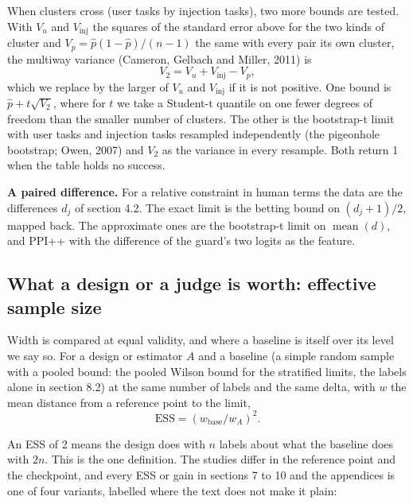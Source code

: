 \documentclass[11pt]{article}
\begin{document}
When clusters cross (user tasks by injection tasks), two more bounds are tested. With $V_{u}$ and $V_{\mathrm{inj}}$ the squares of the standard error above for the two kinds of cluster and $V_{p} = \hat{p} (1 - \hat{p} ) / (n - 1)$ the same with every pair its own cluster, the multiway variance (Cameron, Gelbach and Miller, 2011) is
\[
V_{2} = V_{u} + V_{\mathrm{inj}} - V_{p} ,
\]
which we replace by the larger of $V_{u}$ and $V_{\mathrm{inj}}$ if it is not positive. One bound is $\hat{p} + t \sqrt{V_{2}}$, where for $t$ we take a Student-t quantile on one fewer degrees of freedom than the smaller number of clusters. The other is the bootstrap-t limit with user tasks and injection tasks resampled independently (the pigeonhole bootstrap; Owen, 2007) and $V_{2}$ as the variance in every resample. Both return 1 when the table holds no success.


\textbf{A paired difference.} For a relative constraint in human terms the data are the differences $d_{j}$ of section 4.2. The exact limit is the betting bound on $(d_{j} + 1) / 2$, mapped back. The approximate ones are the bootstrap-t limit on $\operatorname{mean} (d )$, and PPI++ with the difference of the guard's two logits as the feature.


\subsection{What a design or a judge is worth: effective sample size}

Width is compared at equal validity, and where a baseline is itself over its level we say so. For a design or estimator $A$ and a baseline (a simple random sample with a pooled bound: the pooled Wilson bound for the stratified limits, the labels alone in section 8.2) at the same number of labels and the same delta, with $w$ the mean distance from a reference point to the limit,
\[
\mathrm{ESS} = ( w_{\mathrm{base}} / w_{A} )^{2}.
\]

An ESS of 2 means the design does with $n$ labels about what the baseline does with $2n$. This is the one definition. The studies differ in the reference point and the checkpoint, and every ESS or gain in sections 7 to 10 and the appendices is one of four variants, labelled where the text does not make it plain:
\end{document}
